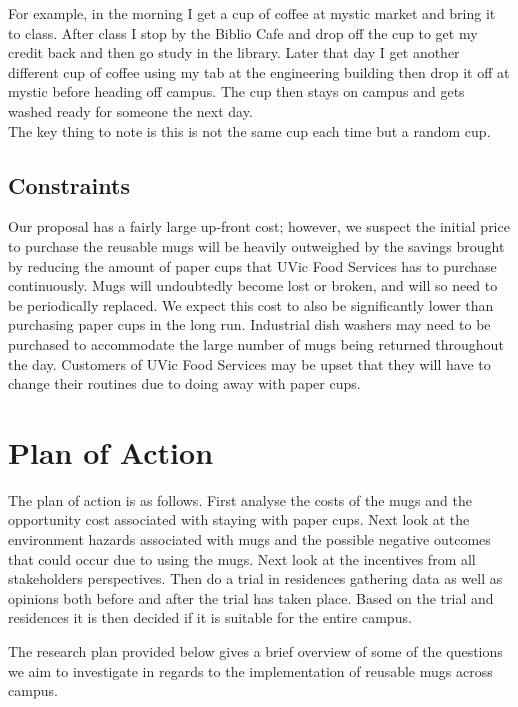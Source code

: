 \documentclass[letterpaper,11pt]{texMemo}
\begin{document}
For example, in the morning I get a cup of coffee at mystic market and bring it to 
class. After class I stop by the Biblio Cafe and drop off the cup to get my credit back 
and then go study in the library. Later that day I get another different cup of coffee using my tab 
at the engineering building then drop it off at mystic before heading off campus.
The cup then stays on campus and gets washed ready for someone the next day.\\

The key thing to note is this is not the same cup each time but a random cup.

\subsection*{Constraints}
Our proposal has a fairly large up-front cost; however, we suspect the initial
price to purchase the reusable mugs will be heavily outweighed by the savings
brought by reducing the amount of paper cups that UVic Food Services has to
purchase continuously. Mugs will undoubtedly become lost or broken, and will so
need to be periodically replaced. We expect this cost to also be significantly
lower than purchasing paper cups in the long run. Industrial dish washers may need 
to be purchased to accommodate the large number of mugs being returned throughout 
the day. Customers of UVic Food Services may be upset that they will have to change 
their routines due to doing away with paper cups.

\section*{Plan of Action}

The plan of action is as follows. First analyse the costs
of the mugs and the opportunity cost associated with staying with paper cups.
Next look at the environment hazards associated with mugs and the possible negative outcomes that could occur due to using the mugs.
Next look at the incentives from all stakeholders perspectives. Then do a trial
in residences gathering data as well as opinions both before and after the trial
has taken place. Based on the trial and residences it is then decided if it is 
suitable for the entire campus.

The research plan provided below gives a brief overview of some of the questions
we aim to investigate in regards to the implementation of reusable mugs across
campus.\\\\
\end{document}
